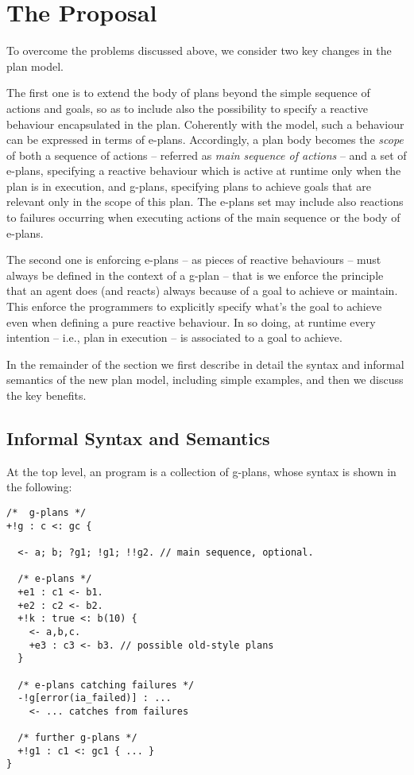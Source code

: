 \section{The {\aser} Proposal}
\label{sec:proposal}

To overcome the problems discussed above, we consider two key changes in the plan model. 

%
% 
%
The first one is to extend the body of plans beyond the simple sequence of actions and goals, so as to include also the possibility to specify a reactive behaviour encapsulated in the plan.
%
Coherently with the {\asl} model, such a behaviour can be expressed in terms of e-plans.
%
Accordingly, a plan body becomes the \emph{scope} of both a sequence of actions -- referred as \emph{main sequence of actions} -- and a set of e-plans, specifying a reactive behaviour which is active at runtime only when the plan is in execution, and g-plans, specifying plans to achieve goals that are relevant only in the scope of this plan.
%
The e-plans set may include also reactions to failures occurring when executing actions of the main sequence or the body of e-plans.

%
%
%
The second one is enforcing e-plans -- as pieces of reactive behaviours -- must always be defined in the context of a g-plan -- that is we enforce the principle that an agent does (and reacts) always because of a goal to achieve or maintain.
%
This enforce the programmers to explicitly specify what's the goal to achieve even when defining a pure reactive behaviour. 
%
In so doing, at runtime every intention -- i.e., plan in execution -- is associated to a goal to achieve.

In the remainder of the section we first describe in detail the syntax and informal semantics of the new plan model, including simple examples, and then we discuss the key benefits. 

\subsection{Informal Syntax and Semantics}

At the top level, an {\aser} program is a collection of g-plans, whose syntax is shown in the following:
%
%
{\small
\begin{verbatim}
/*  g-plans */
+!g : c <: gc { 

  <- a; b; ?g1; !g1; !!g2. // main sequence, optional.

  /* e-plans */
  +e1 : c1 <- b1.	
  +e2 : c2 <- b2.
  +!k : true <: b(10) {
    <- a,b,c.
    +e3 : c3 <- b3. // possible old-style plans
  }	
  
  /* e-plans catching failures */
  -!g[error(ia_failed)] : ...
    <- ... catches from failures 

  /* further g-plans */
  +!g1 : c1 <: gc1 { ... }
}

\end{verbatim}}

